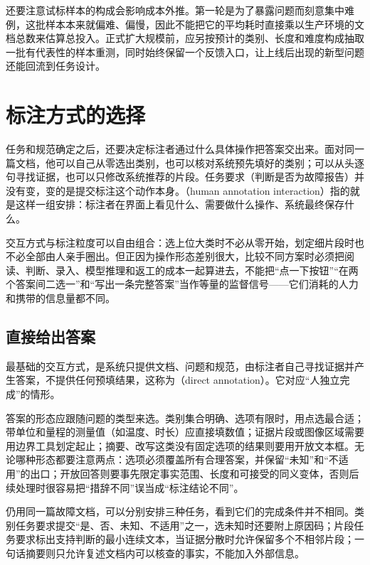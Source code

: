 还要注意试标样本的构成会影响成本外推。第一轮是为了暴露问题而刻意集中难例，这批样本本来就偏难、偏慢，因此不能把它的平均耗时直接乘以生产环境的文档总数来估算总投入。正式扩大规模前，应另按预计的类别、长度和难度构成抽取一批有代表性的样本重测，同时始终保留一个反馈入口，让上线后出现的新型问题还能回流到任务设计。

\section{标注方式的选择}
\label{sec:knowledge-acquisition-human-interaction}

任务和规范确定之后，还要决定标注者通过什么具体操作把答案交出来。面对同一篇文档，他可以自己从零选出类别，也可以核对系统预先填好的类别；可以从头逐句寻找证据，也可以只修改系统推荐的片段。任务要求（判断是否为故障报告）并没有变，变的是提交标注这个动作本身。（human annotation interaction）指的就是这样一组安排：标注者在界面上看见什么、需要做什么操作、系统最终保存什么。

交互方式与标注粒度可以自由组合：选上位大类时不必从零开始，划定细片段时也不必全部由人亲手圈出。但正因为操作形态差别很大，比较不同方案时必须把阅读、判断、录入、模型推理和返工的成本一起算进去，不能把“点一下按钮”“在两个答案间二选一”和“写出一条完整答案”当作等量的监督信号——它们消耗的人力和携带的信息量都不同。

\subsection{直接给出答案}
\label{sec:knowledge-acquisition-human-direct-answer}

最基础的交互方式，是系统只提供文档、问题和规范，由标注者自己寻找证据并产生答案，不提供任何预填结果，这称为（direct annotation）。它对应“人独立完成”的情形。

答案的形态应跟随问题的类型来选。类别集合明确、选项有限时，用点选最合适；带单位和量程的测量值（如温度、时长）应直接填数值；证据片段或图像区域需要用边界工具划定起止；摘要、改写这类没有固定选项的结果则要用开放文本框。无论哪种形态都要注意两点：选项必须覆盖所有合理答案，并保留“未知”和“不适用”的出口；开放回答则要事先限定事实范围、长度和可接受的同义变体，否则后续处理时很容易把“措辞不同”误当成“标注结论不同”。

仍用同一篇故障文档，可以分别安排三种任务，看到它们的完成条件并不相同。类别任务要求提交“是、否、未知、不适用”之一，选未知时还要附上原因码；片段任务要求标出支持判断的最小连续文本，当证据分散时允许保留多个不相邻片段；一句话摘要则只允许复述文档内可以核查的事实，不能加入外部信息。

